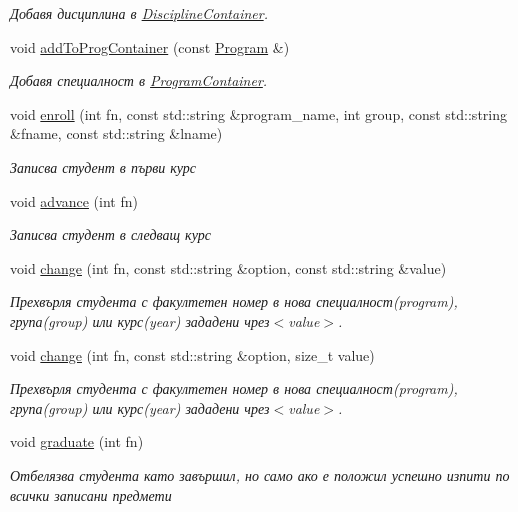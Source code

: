 \begin{DoxyCompactItemize}
\begin{DoxyCompactList}\small\item\em Добавя дисциплина в \hyperlink{class_discipline_container}{Discipline\+Container}. \end{DoxyCompactList}\item 
void \hyperlink{class_susi_ae0c687f02724b86c9925aff184a62387}{add\+To\+Prog\+Container} (const \hyperlink{class_program}{Program} \&)
\begin{DoxyCompactList}\small\item\em Добавя специалност в \hyperlink{class_program_container}{Program\+Container}. \end{DoxyCompactList}\item 
void \hyperlink{class_susi_ab9b88542f94c2704ae5ca128a9022eff}{enroll} (int fn, const std\+::string \&program\+\_\+name, int group, const std\+::string \&fname, const std\+::string \&lname)
\begin{DoxyCompactList}\small\item\em Записва студент в първи курс \end{DoxyCompactList}\item 
void \hyperlink{class_susi_a6be5a7767b5c4d06459ef4a3542aaee6}{advance} (int fn)
\begin{DoxyCompactList}\small\item\em Записва студент в следващ курс \end{DoxyCompactList}\item 
void \hyperlink{class_susi_a4b7d060513f731cd277bd4c5ae6b63de}{change} (int fn, const std\+::string \&option, const std\+::string \&value)
\begin{DoxyCompactList}\small\item\em Прехвърля студента с факултетен номер в нова специалност(program), група(group) или курс(year) зададени чрез$<$value$>$. \end{DoxyCompactList}\item 
void \hyperlink{class_susi_a1c63140f45aed3553615f5da680e4edd}{change} (int fn, const std\+::string \&option, size\+\_\+t value)
\begin{DoxyCompactList}\small\item\em Прехвърля студента с факултетен номер в нова специалност(program), група(group) или курс(year) зададени чрез$<$value$>$. \end{DoxyCompactList}\item 
void \hyperlink{class_susi_a59e196ecdbd15d01f846b442cdc9a345}{graduate} (int fn)
\begin{DoxyCompactList}\small\item\em Отбелязва студента като завършил, но само ако е положил успешно изпити по всички записани предмети \end{DoxyCompactList}\item 

\end{DoxyCompactItemize}
